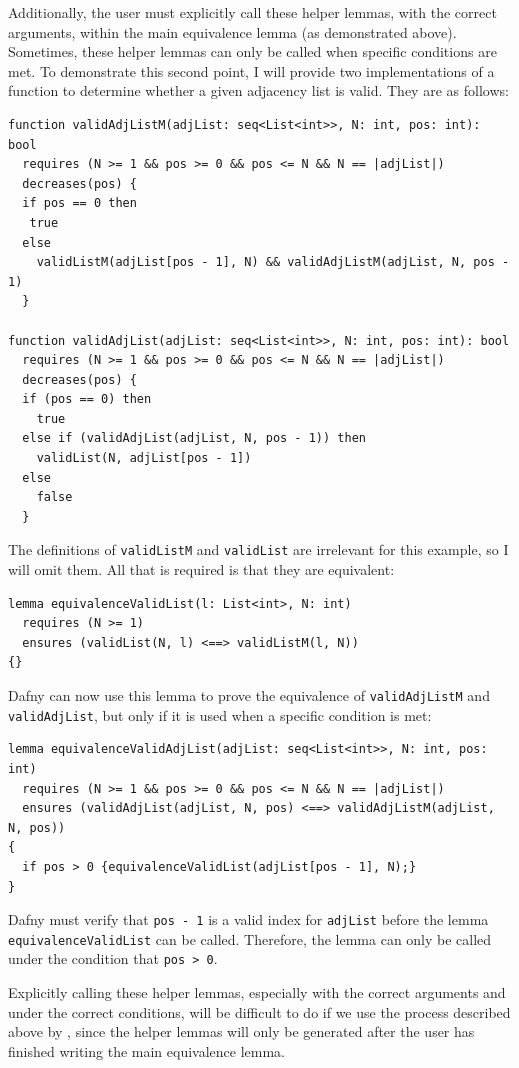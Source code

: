 \documentclass[a4paper, 11pt]{article}
\begin{document}
Additionally, the user must explicitly call these helper lemmas, with the correct arguments, within the main equivalence lemma (as demonstrated above). Sometimes, these helper lemmas can only be called when specific conditions are met. To demonstrate this second point, I will provide two implementations of a function to determine whether a given adjacency list is valid. They are as follows:
\begin{lstlisting}[caption=\lstinline|validAdjListM| and \lstinline|validAdjList| Functions]
function validAdjListM(adjList: seq<List<int>>, N: int, pos: int): bool
  requires (N >= 1 && pos >= 0 && pos <= N && N == |adjList|)
  decreases(pos) {
  if pos == 0 then
   true
  else
    validListM(adjList[pos - 1], N) && validAdjListM(adjList, N, pos - 1)
  }

function validAdjList(adjList: seq<List<int>>, N: int, pos: int): bool
  requires (N >= 1 && pos >= 0 && pos <= N && N == |adjList|)
  decreases(pos) {
  if (pos == 0) then 
    true
  else if (validAdjList(adjList, N, pos - 1)) then
    validList(N, adjList[pos - 1])
  else
    false
  }
\end{lstlisting}
%
The definitions of \lstinline|validListM| and \lstinline|validList| are irrelevant for this example, so I will omit them. All that is required is that they are equivalent:
\begin{lstlisting}[caption=Equivalence Lemma for \lstinline|validListM| and \lstinline|validList|]
lemma equivalenceValidList(l: List<int>, N: int)
  requires (N >= 1)
  ensures (validList(N, l) <==> validListM(l, N))
{}
\end{lstlisting}
%
Dafny can now use this lemma to prove the equivalence of \lstinline|validAdjListM| and \lstinline|validAdjList|, but only if it is used when a specific condition is met:
\begin{lstlisting}[caption=Equivalence Lemma for \lstinline|validAdjListM| and \lstinline|validAdjList|]
lemma equivalenceValidAdjList(adjList: seq<List<int>>, N: int, pos: int)
  requires (N >= 1 && pos >= 0 && pos <= N && N == |adjList|)
  ensures (validAdjList(adjList, N, pos) <==> validAdjListM(adjList, N, pos))
{
  if pos > 0 {equivalenceValidList(adjList[pos - 1], N);}
}
\end{lstlisting}
%
Dafny must verify that \lstinline|pos - 1| is a valid index for \lstinline|adjList| before the lemma \lstinline|equivalenceValidList| can be called. Therefore, the lemma can only be called under the condition that \lstinline|pos > 0|.

Explicitly calling these helper lemmas, especially with the correct arguments and under the correct conditions, will be difficult to do if we use the process described above by \textcite{milovancevicProvingDisprovingEquivalence2023}, since the helper lemmas will only be generated after the user has finished writing the main equivalence lemma. 
\end{document}
